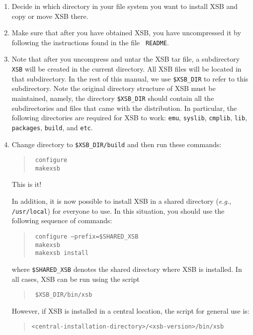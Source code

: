 \begin{enumerate}
\item	Decide in which directory in your file system you want to install
  XSB and copy or move XSB there.
\item Make sure that after you have obtained XSB, you have
  uncompressed it by following the instructions found in the file {\tt
    README}.
  
\item Note that after you uncompress and untar the XSB tar file, a
  subdirectory {\tt XSB} will be created in the current directory. All
  XSB files will be located in that subdirectory.  In the rest of this
  manual, we use {\tt \$XSB\_DIR} to refer to this subdirectory.  Note
  the original directory structure of XSB must be maintained, namely,
  the directory {\tt \$XSB\_DIR} should contain all the subdirectories
  and files that came with the distribution. In particular, the
  following directories are required for XSB to work: \verb'emu',
  \verb'syslib', \verb'cmplib', \verb'lib', \verb'packages',
  \verb'build', and \verb'etc'.


\item Change directory to {\tt \$XSB\_DIR/build} and then run these commands:
  \begin{quote}
    \tt
    configure\\
    \tt
    makexsb
  \end{quote}
  This is it!
  
  In addition, it is now possible to install XSB in a shared directory
  ({\it e.g.}, {\tt /usr/local}) for everyone to use.  In this situation,
  you should use the following sequence of commands:
  \begin{quote}
    \tt
    configure --prefix=\$SHARED\_XSB\\
    \tt
    makexsb\\
    \tt
    makexsb install
  \end{quote}
  where {\tt \$SHARED\_XSB}  denotes the shared directory where XSB is
  installed.  In all cases, XSB can be run using the script
  \begin{quote}
    \tt
    \$XSB\_DIR/bin/xsb
  \end{quote}
  However, if XSB is installed in a central location, the script for
  general use is:
  \begin{quote}
    \verb'<central-installation-directory>/<xsb-version>/bin/xsb'
  \end{quote}
\end{enumerate}


